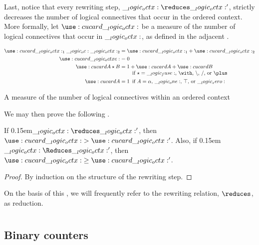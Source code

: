 Last, notice that every rewriting step, $\octx \reduces \octx'$, strictly decreases the number of logical connectives that occur in the ordered context.
More formally, let $\card{\octx}$ be a measure of the number of logical connectives that occur in $\__logic_octx:$, as defined in the adjacent .
%
\begin{marginfigure}
  \begin{align*}
    \card{\octx_1 \oc \octx_2} &= \card{\octx_1} + \card{\octx_2} \\
    \card{\octxe} &= 0 \\
    \card{A \star B} &= \begin{tabular}[t]{@{}l@{}}
                          $1 + \card{A} + \card{B}$ \\
                          \quad if $\mathord{\star} = \mathord{\fuse}$, $\mathord{\with}$, $\mathord{\limp}$, $\mathord{\pmir}$, or $\mathord{\plus}$
                         \end{tabular} \\
    \card{A} &= \mathrlap{1}
                    \quad \text{if $A = \alpha$, $\one$, $\top$, or $\zero$}
  \end{align*}
  \caption{A measure of the number of logical connectives within an ordered context}\label{fig:ordered-rewriting:measure}
\end{marginfigure}%
%
We may then prove the following .
%
\begin{fact}\label{fact:ordered-rewriting:reduction}
  If \kern0.15em$\octx \reduces \octx'$, then $\card{\octx} > \card{\octx'}$.
  Also, if \kern0.15em$\octx \Reduces \octx'$, then $\card{\octx} \geq \card{\octx'}$.
\end{fact}
%
\begin{proof}
  By induction on the structure of the rewriting step.
\end{proof}
%
\noindent
On the basis of this , we will frequently refer to the rewriting relation, $\reduces$, as reduction.


\section{}

\subsection{Binary counters}

